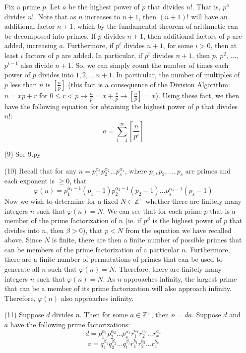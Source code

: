 \documentclass[12pt]{article}
\begin{document}
\begin{itemize}
Fix a prime $p$. Let $a$ be the highest power of $p$ that divides $n!$. That is, $p^a$ divides $n!$. Note that as $n$ increases to $n+1$, then $(n+1)!$ will have an additional factor $n+1$, which by the fundamental theorem of arithmetic can be decomposed into primes. If $p$ divides $n+1$, then additional factors of $p$ are added, increasing $a$. Furthermore, if $p^i$ divides $n+1$, for some $i > 0$, then at least $i$ factors of $p$ are added. In particular, if $p^i$ divides $n+1$, then $p$, $p^2$, ..., $p^{i-1}$ also divide $n+1$. So, we can simply count the number of times each power of $p$ divides into $1, 2, .., n+1$. In particular, the number of multiples of $p$ less than $n$ is $\left[ \frac{n}{p} \right]$ (this fact is a consequence of the Division Algorithm: $n = xp + r$ for $0 \leq r < p \rightarrow \frac{n}{p} = x + \frac{r}{p} \rightarrow \left[ \frac{n}{p} \right] = x$). Using these fact, we then have the following equation for obtaining the highest power of $p$ that divides $n!$:
$$a = \displaystyle\sum_{i=1}^\infty \left[\frac{n}{p^i} \right]$$
\item[(9)]
See 9.py
\item[(10)]
Recall that for any $n = p_1^{\alpha_1}p_2^{\alpha_2}...p_s^{\alpha_s}$, where $p_1, p_2, ..., p_s$ are primes and each exponent is $\geq 0$, that $$\varphi(n) = p_1^{\alpha_1 - 1}(p_1 - 1)p_2^{\alpha_2 - 1}(p_2 - 1)...p_s^{\alpha_s - 1}(p_s - 1)$$
Now we wish to determine for a fixed $N \in \mathbb{Z}^+$ whether there are finitely many integers $n$ such that $\varphi(n) = N$. We can see that for each prime $p$ that is a member of the prime factorization of $n$ (ie. if $p^\beta$ is the highest power of $p$ that divides into $n$, then $\beta > 0$), that $p < N$ from the equation we have recalled above. Since $N$ is finite, there are then a finite number of possible primes that can be members of the prime factorization of a particular $n$. Furthermore, there are a finite number of permutations of primes that can be used to generate all $n$ such that $\varphi(n) = N$. Therefore, there are finitely many integers $n$ such that $\varphi(n) = N$. As $n$ approaches infinity, the largest prime that can be a member of its prime factorization will also approach infinity. Therefore, $\varphi(n)$ also approaches infinity.
\item[(11)] Suppose $d$ divides $n$. Then for some $a \in \mathbb{Z}^+$, then $n = da$. Suppose $d$ and $a$ have the following prime factorizations:
$$d = p_1^{\alpha_1}p_2^{\alpha_2}...p_s^{\alpha_s}r_1^{a_1}r_2^{a_2}...r_x^{a_x}$$
$$a = q_1^{\beta_1}q_2^{\beta_2}...q_t^{\beta_t}r_1^{b_1}r_2^{b_2}...r_x^{b_x}$$

\end{itemize}
\end{document}
